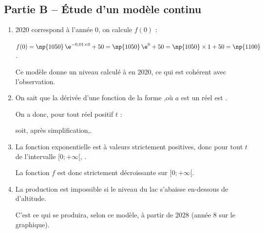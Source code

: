 \subsection*{Partie B -- Étude d'un modèle continu}
	\begin{enumerate}
		\item 2020 correspond à l'année 0, on calcule $f(0)$ :

		{$f(0) = \np{1050}\,\e^{-0,01\times0} + 50=\np{1050}\,\e^{0} + 50=\np{1050}\times1+50=\np{1100}$}.

		Ce modèle donne un niveau calculé à  en 2020, ce qui est cohérent avec l'observation.

		\item On sait que la dérivée d'une fonction de la forme ,\quad  où $a$ est un réel est .

		On a donc, pour tout réel positif $t$ :

		soit, après simplification,.

		\item La fonction exponentielle est à valeurs strictement positives, donc pour tout $t$ de l'intervalle {$[0;+\infty[$}, .

		La fonction $f$ est donc strictement décroissante sur {$[0;+\infty[$.}

		\item La production est impossible si le niveau du lac s'abaisse en-dessous de  d'altitude.

		C'est ce qui se produira, selon ce modèle, à partir de 2028 (année 8 sur le graphique).
	\end{enumerate}

